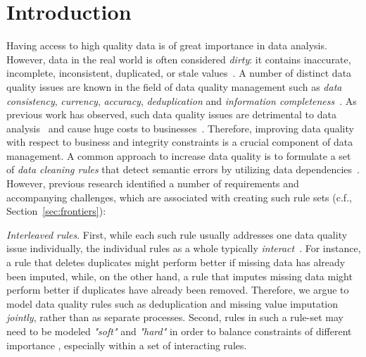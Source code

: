\section{Introduction}
\label{sec:intro}

Having access to high quality data is of great importance in data analysis. However, data in the real world is often considered \textit{dirty}: it contains inaccurate, incomplete, inconsistent, duplicated, or stale values~\cite{chu2004blissful}. A number of distinct data quality issues are known in the field of data quality management such as \textit{data consistency}, \textit{currency}, \textit{accuracy}, \textit{deduplication} and \textit{information completeness}~\cite{fan2012foundations}. As previous work has observed, such data quality issues are detrimental to data analysis~\cite{national2013Frontiers,Fan:2008:CFD:1366102.1366103} and cause huge costs to businesses~\cite{waynew.eckerson2002}. Therefore, improving data quality with respect to business and integrity constraints is a crucial component of data management. 
A common approach to increase data quality is to formulate a set of \textit{data cleaning rules} that detect semantic errors by utilizing data dependencies~\cite{fan2012foundations, Arasu:2009:LDC:1546683.1547340, Dallachiesa:2013:NCD:2463676.2465327, llunaticVDLB2013b}. However, previous research identified a number of requirements and accompanying challenges, which are associated with creating such rule sets (c.f., Section~\ref{sec:frontiers}): 

\textit{Interleaved rules}. First, while each such rule usually addresses one data quality issue individually, the individual rules as a whole typically \textit{interact}~\cite{fan2012foundations, Fan:2014:IRM:2628135.2567657}. For instance, a rule that deletes duplicates might perform better if missing data has already been imputed, while, on the other hand, a rule that imputes missing data might perform better if duplicates have already been removed. Therefore, we argue to model data quality rules such as deduplication and missing value imputation \textit{jointly}, rather than as separate processes.
Second, rules in such a rule-set may need to be modeled \textit{"soft"} and \textit{"hard"} in order to balance constraints of different importance \cite{Yakout:2013:DSU:2463676.2463706}, especially within a set of interacting rules. 

